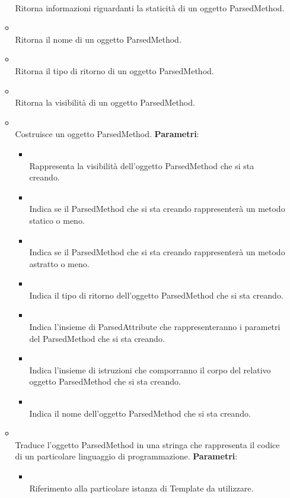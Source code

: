 \begin{itemize}
\begin{itemize}
\\ Ritorna informazioni riguardanti la staticità di un oggetto ParsedMethod.
\item {}
\\ Ritorna il nome di un oggetto ParsedMethod.
\item {}
\\ Ritorna il tipo di ritorno di un oggetto ParsedMethod.
\item {}
\\ Ritorna la visibilità di un oggetto ParsedMethod.
\item {}
\\ Costruisce un oggetto ParsedMethod.
\textbf{Parametri}:
\begin{itemize}
\item {}
\\ Rappresenta la visibilità dell'oggetto ParsedMethod che si sta creando.
\item {}
\\ Indica se il ParsedMethod che si sta creando rappresenterà un metodo statico o meno.
\item {}
\\ Indica se il ParsedMethod che si sta creando rappresenterà un metodo astratto o meno.
\item {}
\\ Indica il tipo di ritorno dell'oggetto ParsedMethod che si sta creando.
\item {}
\\ Indica l'insieme di ParsedAttribute che rappresenteranno i parametri del ParsedMethod che si sta creando.
\item {}
\\ Indica l'insieme di istruzioni che comporranno il corpo del relativo oggetto ParsedMethod che si sta creando.
\item {}
\\ Indica il nome dell'oggetto ParsedMethod che si sta creando.
\end{itemize}
\item {}
\\ Traduce l'oggetto ParsedMethod in una stringa che rappresenta il codice di un particolare linguaggio di programmazione.
\textbf{Parametri}:
\begin{itemize}
\item {}
\\ Riferimento alla particolare istanza di Template da utilizzare.
\end{itemize}
\end{itemize}
\end{itemize}

